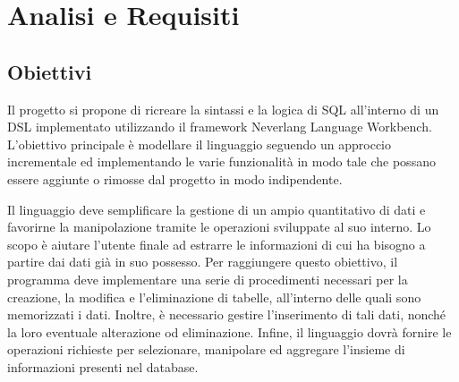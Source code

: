 \documentclass[12pt,a4paper,openright,twoside]{book}
\begin{document}
\chapter{Analisi e Requisiti}
\label{chap:requisiti}

\section{Obiettivi}
Il progetto si propone di ricreare la sintassi e la logica di \ac{SQL} all’interno di un \ac{DSL} implementato utilizzando il framework 
Neverlang Language Workbench. L’obiettivo principale è modellare il linguaggio seguendo un approccio incrementale ed implementando le varie 
funzionalità in modo tale che possano essere aggiunte o rimosse dal progetto in modo indipendente.

Il linguaggio deve semplificare la gestione di un ampio quantitativo di dati e favorirne la manipolazione tramite le operazioni 
sviluppate al suo interno. Lo scopo è aiutare l’utente finale ad estrarre le informazioni di cui ha bisogno a partire dai dati già in suo 
possesso. Per raggiungere questo obiettivo, il programma deve implementare una serie di procedimenti necessari per la creazione, la modifica e 
l’eliminazione di tabelle, all’interno delle quali sono memorizzati i dati. Inoltre, è necessario gestire l’inserimento di tali dati, nonché 
la loro eventuale alterazione od eliminazione. Infine, il linguaggio dovrà fornire le operazioni richieste per selezionare, manipolare ed 
aggregare l’insieme di informazioni presenti nel database.
\end{document}
